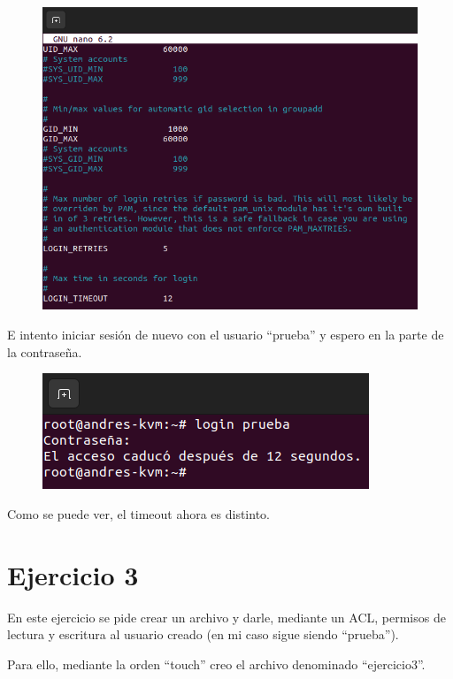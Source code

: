 \documentclass{article}
\begin{document}
\begin{figure}[H]
    \includegraphics[width=\textwidth]{imagenes/tout12.png}
\end{figure}

E intento iniciar sesión de nuevo con el usuario ``prueba'' y espero en la parte de la contraseña.

\begin{figure}[H]
    \includegraphics[width=\textwidth]{imagenes/tout12login.png}
\end{figure}

Como se puede ver, el timeout ahora es distinto.


\section*{Ejercicio 3}
En este ejercicio se pide crear un archivo y darle, mediante un ACL, permisos de lectura y escritura al usuario creado (en mi caso sigue siendo ``prueba'').

Para ello, mediante la orden ``touch'' creo el archivo denominado ``ejercicio3''.
\end{document}

